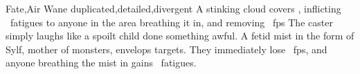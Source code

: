   {Fate,Air}%
  {Wane}%
  {duplicated,detailed,divergent}%
  {}%
  {A stinking cloud covers , inflicting ~\glspl{fatigue} to anyone in the area breathing it in, and removing \showDam~\glspl{fp}}%
  {
    The caster simply laughs like a spoilt child done something awful.
    A fetid mist in the form of Sylf, mother of monsters, envelops  targets.
    They immediately lose \showDam~\glspl{fp}, and anyone breathing the mist in gains ~\glspl{fatigue}.
  }

